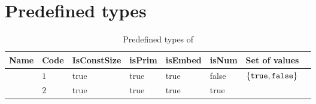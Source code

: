 \section{Predefined types}
\label{sec:appendix:predeftypes}

\begin{table}[h]
    \small
    \begin{tabu}{|l |l |l |l |l |l |l |l|}
     \hline
     \rowfont{\bfseries}
        Name   &   Code   &  IsConstSize & isPrim & isEmbed  & isNum & Set of values \\
     \hline
        	&	$1$ 	&	true	&	true	&	true	&	false	 
          &  $\Set{\lst{true}, \lst{false}}$ \\
     \hline
        	&	$2$	&	true	& true	&	true	&	true	&  \\
    \hline
    \end{tabu}
    \caption{Predefined types of \langname}
    \label{table:predeftypes}
\end{table}

